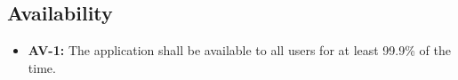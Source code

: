 \subsection{Availability}

\begin{itemize}
    \item \textbf{AV-1:} The application shall be available to all users for at
    least 99.9\% of the time.
\end{itemize}
